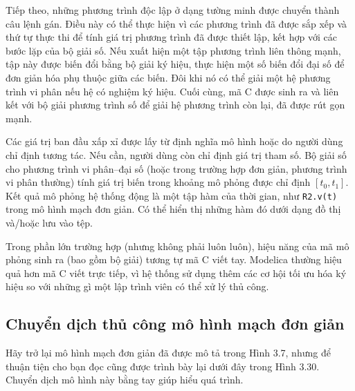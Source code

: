 Tiếp theo, những phương trình độc lập ở dạng tường minh được chuyển thành câu lệnh gán. Điều này có thể thực hiện vì các phương trình đã được sắp xếp và thứ tự thực thi để tính giá trị phương trình đã được thiết lập, kết hợp với các bước lặp của bộ giải số. Nếu xuất hiện một tập phương trình liên thông mạnh, tập này được biến đổi bằng bộ giải ký hiệu, thực hiện một số biến đổi đại số để đơn giản hóa phụ thuộc giữa các biến. Đôi khi nó có thể giải một hệ phương trình vi phân nếu hệ có nghiệm ký hiệu. Cuối cùng, mã C được sinh ra và liên kết với bộ giải phương trình số để giải hệ phương trình còn lại, đã được rút gọn mạnh.

Các giá trị ban đầu xấp xỉ được lấy từ định nghĩa mô hình hoặc do người dùng chỉ định tương tác. Nếu cần, người dùng còn chỉ định giá trị tham số. Bộ giải số cho phương trình vi phân--đại số (hoặc trong trường hợp đơn giản, phương trình vi phân thường) tính giá trị biến trong khoảng mô phỏng được chỉ định $[t_0,t_1]$. Kết quả mô phỏng hệ thống động là một tập hàm của thời gian, như \texttt{R2.v(t)} trong mô hình mạch đơn giản. Có thể hiển thị những hàm đó dưới dạng đồ thị và/hoặc lưu vào tệp.

Trong phần lớn trường hợp (nhưng không phải luôn luôn), hiệu năng của mã mô phỏng sinh ra (bao gồm bộ giải) tương tự mã C viết tay. Modelica thường hiệu quả hơn mã C viết trực tiếp, vì hệ thống sử dụng thêm các cơ hội tối ưu hóa ký hiệu so với những gì một lập trình viên có thể xử lý thủ công.

\subsection{Chuyển dịch thủ công mô hình mạch đơn giản}
Hãy trở lại mô hình mạch đơn giản đã được mô tả trong Hình 3.7, nhưng để thuận tiện cho bạn đọc cũng được trình bày lại dưới đây trong Hình 3.30. Chuyển dịch mô hình này bằng tay giúp hiểu quá trình.

